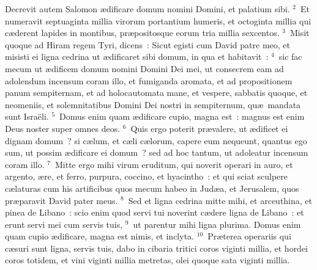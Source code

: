 \bchapter
\lettrine[lines=3,image=true,loversize=0.05,lraise=-0.03]{D}{}ecrevit autem Salomon \ae dificare domum nomini Domini, et palatium sibi.
${}^{2}$~Et numeravit septuaginta millia virorum portantium humeris, et octoginta millia qui c\ae derent lapides in montibus, pr\ae positosque eorum tria millia sexcentos.
${}^{3}$~Misit quoque ad Hiram regem Tyri, dicens~: Sicut egisti cum David patre meo, et misisti ei ligna cedrina ut \ae dificaret sibi domum, in qua et habitavit~:
${}^{4}$~sic fac mecum ut \ae dificem domum nomini Domini Dei mei, ut consecrem eam ad adolendum incensum coram illo, et fumiganda aromata, et ad propositionem panum sempiternam, et ad holocautomata mane, et vespere, sabbatis quoque, et neomeniis, et solemnitatibus Domini Dei nostri in sempiternum, qu\ae\ mandata sunt Isra\"eli.
${}^{5}$~Domus enim quam \ae dificare cupio, magna est~: magnus est enim Deus noster super omnes deos.
${}^{6}$~Quis ergo poterit pr\ae valere, ut \ae dificet ei dignam domum~? si c\ae lum, et c\ae li c\ae lorum, capere eum nequeunt, quantus ego sum, ut possim \ae dificare ei domum~? sed ad hoc tantum, ut adoleatur incensum coram illo.
${}^{7}$~Mitte ergo mihi virum eruditum, qui noverit operari in auro, et argento, \ae re, et ferro, purpura, coccino, et hyacintho~: et qui sciat sculpere c\ae laturas cum his artificibus quos mecum habeo in Jud\ae a, et Jerusalem, quos pr\ae paravit David pater meus.
${}^{8}$~Sed et ligna cedrina mitte mihi, et arceuthina, et pinea de Libano~: scio enim quod servi tui noverint c\ae dere ligna de Libano~: et erunt servi mei cum servis tuis,
${}^{9}$~ut parentur mihi ligna plurima. Domus enim quam cupio \ae dificare, magna est nimis, et inclyta.
${}^{10}$~Pr\ae terea operariis qui c\ae suri sunt ligna, servis tuis, dabo in cibaria tritici coros viginti millia, et hordei coros totidem, et vini viginti millia metretas, olei quoque sata viginti millia.


